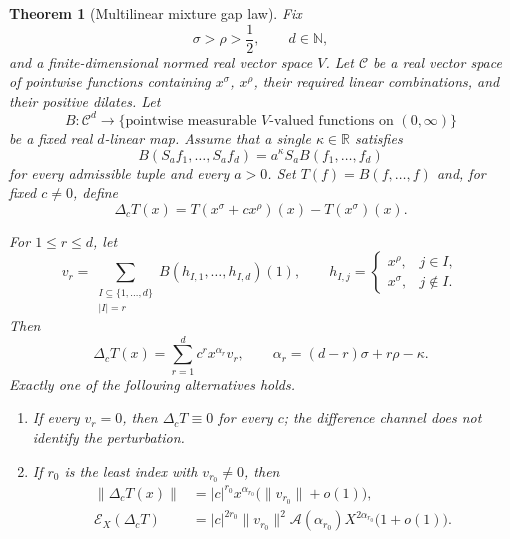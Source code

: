 \documentclass[11pt,a4paper]{amsart}
\newtheorem{theorem}{Theorem}[section]
\theoremstyle{definition}
\newcommand{\R}{\mathbb R}
\newcommand{\norm}[1]{\lVert #1\rVert}
\newcommand{\cE}{\mathcal E}
\newcommand{\cA}{\mathcal A}
\begin{document}
\begin{theorem}[Multilinear mixture gap law]\label{thm:multilinear}
Fix
\[
  \sigma>\rho>\frac12,
  \qquad d\in\mathbb N,
\]
and a finite-dimensional normed real vector space $V$.  Let $\mathcal C$ be a real vector space of pointwise functions containing $x^\sigma$, $x^\rho$, their required linear combinations, and their positive dilates.  Let
\[
 B:\mathcal C^d\longrightarrow
 \{\text{pointwise measurable $V$-valued functions on }(0,\infty)\}
\]
be a fixed real $d$-linear map.  Assume that a single $\kappa\in\R$ satisfies
\begin{equation}\label{eq:B-covariance}
 B(S_af_1,\ldots,S_af_d)
 =a^\kappa S_aB(f_1,\ldots,f_d)
\end{equation}
for every admissible tuple and every $a>0$.  Set $T(f)=B(f,\ldots,f)$ and, for fixed $c\ne0$, define
\begin{equation}\label{eq:Delta-T}
 \Delta_cT(x)=T(x^\sigma+cx^\rho)(x)-T(x^\sigma)(x).
\end{equation}

For $1\le r\le d$, let
\begin{equation}\label{eq:v-r}
 v_r=\sum_{\substack{I\subseteq\{1,\ldots,d\}\\|I|=r}}
 B(h_{I,1},\ldots,h_{I,d})(1),
 \qquad
 h_{I,j}=\begin{cases}x^\rho,&j\in I,\\x^\sigma,&j\notin I.
 \end{cases}
\end{equation}
Then
\begin{equation}\label{eq:complete-expansion}
 \Delta_cT(x)=\sum_{r=1}^dc^r x^{\alpha_r}v_r,
 \qquad
 \alpha_r=(d-r)\sigma+r\rho-\kappa.
\end{equation}
Exactly one of the following alternatives holds.

\begin{enumerate}[label=\textup{(\alph*)},leftmargin=2.3em]
\item If every $v_r=0$, then $\Delta_cT\equiv0$ for every $c$; the difference channel does not identify the perturbation.
\item If $r_0$ is the least index with $v_{r_0}\ne0$, then
\begin{align}
 \norm{\Delta_cT(x)}
 &=|c|^{r_0}x^{\alpha_{r_0}}
   \bigl(\norm{v_{r_0}}+o(1)\bigr),\label{eq:leading-norm}\\
 \cE_X(\Delta_cT)
 &=|c|^{2r_0}\norm{v_{r_0}}^2
   \cA(\alpha_{r_0})X^{2\alpha_{r_0}}
   \bigl(1+o(1)\bigr).\label{eq:leading-energy}
\end{align}
\end{enumerate}


\end{theorem}
\end{document}
